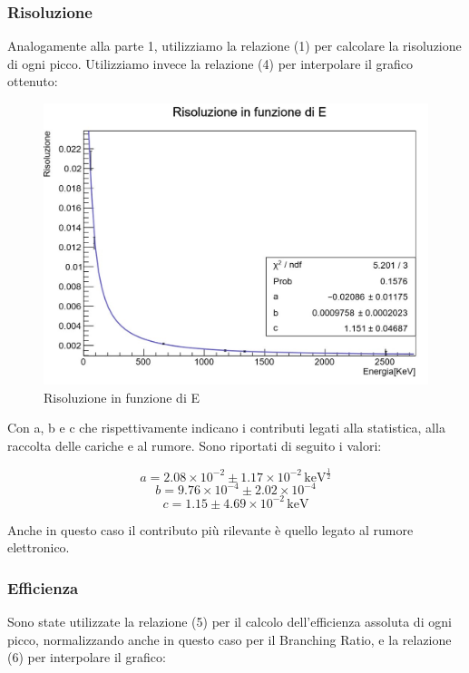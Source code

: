 \documentclass[a4paper,10pt]{article}
\newcommand*{\unit}[1]{\ensuremath{\mathrm{\,#1}}}
\begin{document}

\subsubsection{Risoluzione}
Analogamente alla parte 1, utilizziamo la relazione (1) per calcolare la risoluzione di ogni picco. Utilizziamo invece la relazione (4) per interpolare il grafico ottenuto:

\begin{figure}[H]
    \centering
    \includegraphics[scale=0.45]{grafici/risoluzionemultigamma}
    \caption{Risoluzione in funzione di E}
\end{figure}

\noindent Con a, b e c che rispettivamente indicano i contributi legati alla statistica, alla raccolta delle cariche e al rumore. Sono riportati di seguito i valori:

$$
	a=2.08 \times 10^{-2} \pm 1.17 \times 10^{-2} \unit{keV^{\frac{1}{2}}}
$$
$$
	b=9.76 \times 10^{-4} \pm 2.02 \times 10^{-4}
$$
$$
	c= 1.15 \pm 4.69 \times 10^{-2} \unit{keV}
$$

\noindent Anche in questo caso il contributo pi\`u rilevante \`e quello legato al rumore elettronico.


\subsubsection{Efficienza}
Sono state utilizzate la relazione (5) per il calcolo dell'efficienza assoluta di ogni picco, normalizzando anche in questo caso per il Branching Ratio, e la relazione (6) per interpolare il grafico:
\end{document}

